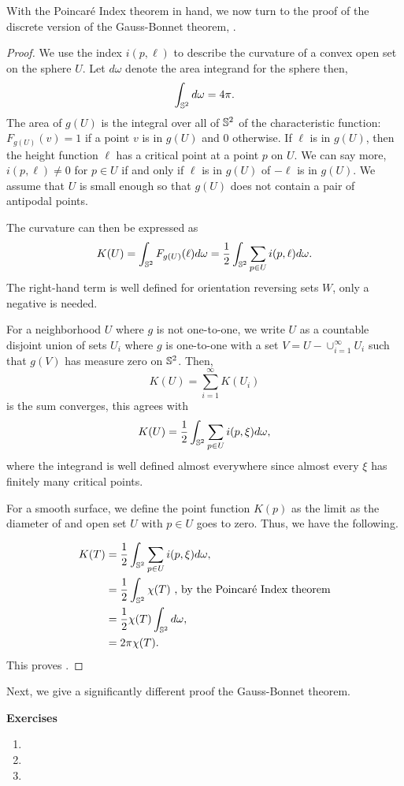 With the Poincar\'e Index theorem in hand, we now turn to the proof of
the discrete version of the Gauss-Bonnet theorem, .
\begin{proof}


We use the index $i(p,\ell)$ to describe the curvature of a convex open
set on the sphere $U$. Let $d\omega$ denote the area integrand for the sphere
then,
$$\int_{\mathbb{S}^2} d\omega =4\pi.$$
The area of $g(U)$ is the integral over all of $\mathbb{S}^2$ of the characteristic function:
$F_{g(U)}(v)=1$ if a point $v$ is in $g(U)$ and $0$ otherwise.
If $\ell$ is in $g(U)$, then the height function $\ell$ has a critical point at
a point $p$ on $U$. We can say more, $i(p,\ell)\neq 0$ for $p\in U$ if and only if
$\ell$ is in $g(U)$ of $-\ell$ is in $g(U)$. We assume that $U$ is small enough so that
$g(U)$ does not contain a pair of antipodal points.

The curvature can then be expressed as 
$$K(U)=\int_{\mathbb{S}^2}F_{g(U)}(\ell)d\omega =\frac{1}{2}\int_{\mathbb{S}^2}\sum_{p\in U} i(p,\ell)d\omega.$$
The right-hand term is well defined for orientation reversing sets $W$, only a negative is needed.

For a neighborhood $U$ where $g$ is not one-to-one, we write $U$ as a countable
disjoint union of sets $U_i$ where $g$ is one-to-one with a set $V=U-\cup_{i=1}^\infty U_i$
such that $g(V)$ has measure zero on $\mathbb{S}^2$. Then,
$$K(U)=\sum_{i=1}^\infty K(U_i)$$ is the sum converges, this agrees with 
$$K(U)=\frac{1}{2}\int_{\mathbb{S}^2}\sum_{p\in U} i(p,\xi)d\omega,$$
where the integrand is well defined almost everywhere since almost every $\xi$
has finitely many critical points.

For a smooth surface, we define the point function $K(p)$ as the limit as the diameter of 
and open set $U$ with $p\in U$ goes to zero. Thus, we have the following.

\begin{align}
K(T) &=\frac{1}{2}\int_{\mathbb{S}^2}\sum_{p\in U} i(p,\xi)d\omega,  \\ \nonumber
       &=\frac{1}{2}\int_{\mathbb{S}^2}\chi(T) \text{ , by the Poincar\'e Index theorem}\\ \nonumber
       &=\frac{1}{2}\chi(T)\int_{\mathbb{S}^2}d\omega, \\ \nonumber
       &=2\pi\chi(T). \nonumber 
\end{align}
This proves .

\end{proof}
Next, we give a significantly different proof the Gauss-Bonnet theorem. 




\noindent \textbf{Exercises}


\begin{enumerate}
	\item 
	
	\item 
	
	\item 
	
\end{enumerate}

\pagebreak
